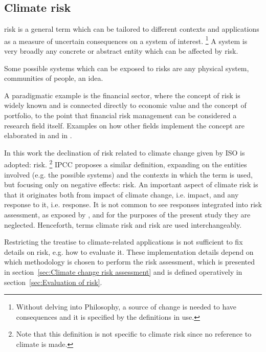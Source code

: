 \subsection{Climate risk}
\Gls{risk} is a general term which can be tailored to different contexts and applications as a measure of uncertain consequences on a system of interest.%
\footnote{Without delving into Philosophy, a source of change is needed to have consequences and it is specified by the definitions in use.}
A system is very broadly any concrete or abstract entity which can be affected by \gls{risk}.
\begin{example}
  Some possible systems which can be exposed to \glspl{risk} are any physical system, communities of people, an idea.
\end{example}
A paradigmatic example is the financial sector, where the concept of \gls{risk} is widely known and is connected directly to economic value and the concept of portfolio, to the point that financial risk management can be considered a research field itself.\cite{2004ChristoffersenElementsOf}
Examples on how other fields implement the concept are elaborated in \cite[14]{2017GIZRiskSupplement} and in \cite{2020ReisingerTheConcept}.

In this work the declination of \gls{risk} related to climate change given by \gls{ISO} is adopted: \glsdesc{risk}.%
\footnote{Note that this definition is not specific to climate \gls{risk} since no reference to climate is made.}
\Gls{IPCC} proposes a similar definition, expanding on the entities involved (e.g. the possible systems) and the contexts in which the term is used, but focusing only on negative effects: \glsdesc{risk}.
An important aspect of climate \gls{risk} is that it originates both from \gls{impact} of climate change, i.e. \glsdesc{impact}, and any response to it, i.e. \glsdesc{response}. It is not common to see \glspl{response} integrated into risk assessment, as exposed by \cite[492]{2021SimpsonAFramework}, and for the purposes of the present study they are neglected.
Henceforth, terms climate \gls{risk} and \gls{risk} are used interchangeably.

Restricting the treatise to climate-related applications is not sufficient to fix details on \gls{risk}, e.g. how to evaluate it. These implementation details depend on which methodology is chosen to perform the risk assessment, which is presented in section~\ref{sec:Climate change risk assessment} and is defined operatively in section~\ref{sec:Evaluation of risk}.

